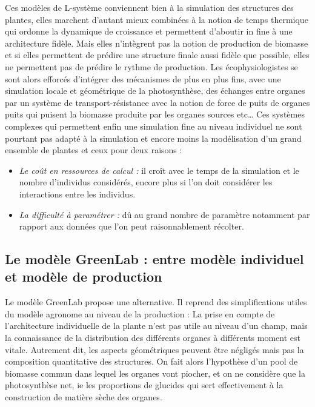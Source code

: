 Ces modèles de L-système conviennent bien à la simulation des structures des plantes, elles marchent d’autant mieux combinées à la notion de temps thermique qui ordonne la dynamique de croissance et permettent d’aboutir in fine à une architecture fidèle. Mais elles n’intègrent pas la notion de production de biomasse et si elles permettent de prédire une structure finale aussi fidèle que possible, elles ne permettent pas de prédire le rythme de production. Les écophysiologistes se sont alors efforcés d’intégrer des mécanismes de plus en plus fins, avec une simulation locale et géométrique de la photosynthèse, des échanges entre organes par un système de transport-résistance avec la notion de force de puits de organes puits qui puisent la biomasse produite par les organes sources etc… Ces systèmes complexes qui permettent enfin une simulation fine au niveau individuel ne sont pourtant pas adapté à la simulation et encore moins la modélisation d’un grand ensemble de plantes et ceux pour deux raisons : 
\begin{itemize}
\item \emph{Le coût en ressources de calcul :} il croît avec le temps de la simulation et le nombre d’individus considérés, encore plus si l’on doit considérer les interactions entre les individus.
\item \emph{La difficulté à paramétrer :} dû au grand nombre de paramètre notamment par rapport aux données que l’on peut raisonnablement récolter.
\end{itemize}

\subsection{Le modèle GreenLab : entre modèle individuel et modèle de production}

Le modèle GreenLab propose une alternative. Il reprend des simplifications utiles du modèle agronome au niveau de la production : La prise en compte de l’architecture individuelle de la plante n’est pas utile au niveau d’un champ, mais la connaissance de la distribution des différents organes à différents moment est vitale. Autrement dit, les aspects géométriques peuvent être négligés mais pas la composition quantitative des structures. On fait alors l’hypothèse d’un pool de biomasse commun dans lequel les organes vont piocher, et on ne considère que la photosynthèse net, ie les proportions de glucides qui sert effectivement à la construction de matière sèche des organes. 

